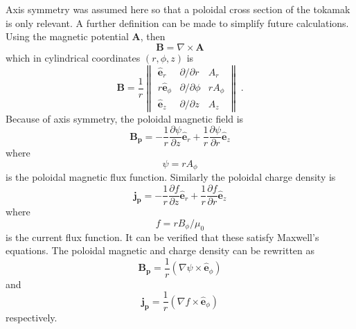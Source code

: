 \documentclass[10pt]{proc}
\begin{document}
Axis symmetry was assumed here so that a poloidal cross section of the tokamak is only relevant. A further definition can be made to simplify future calculations. Using the magnetic potential $\mathbf{A}$, then
\begin{equation}
  \mathbf{B} = \nabla \times \mathbf{A}
\end{equation}
which in cylindrical coordinates $(r,\phi,z)$ is
\begin{equation}
  \mathbf{B} = 
  \dfrac{1}{r}
  \left \|\begin{matrix}
  \widehat{\mathbf{e}}_r & \partial/\partial r & A_r \\
  r \widehat{\mathbf{e}}_\phi & \partial/\partial\phi & rA_\phi \\
  \widehat{\mathbf{e}}_z & \partial/\partial z & A_z
  \end{matrix}\right \| \ .
\end{equation}
Because of axis symmetry, the poloidal magnetic field is
\begin{equation}
  \mathbf{B_p} = -\dfrac{1}{r}\dfrac{\partial \psi}{\partial z}\widehat{\mathbf{e}}_r + \frac{1}{r}\dfrac{\partial\psi}{\partial r}\widehat{\mathbf{e}}_z
\end{equation}
where
\begin{equation}
\psi = rA_\phi
\end{equation}
is the poloidal magnetic flux function. Similarly the poloidal charge density is
\begin{equation}
  \mathbf{j_p} = -\dfrac{1}{r}\dfrac{\partial f}{\partial z}\widehat{\mathbf{e}}_r + \frac{1}{r}\dfrac{\partial f}{\partial r}\widehat{\mathbf{e}}_z
\end{equation}
where
\begin{equation}
  f = r B_\phi /\mu_0
\end{equation}
is the current flux function. It can be verified that these satisfy Maxwell's equations. The poloidal magnetic and charge density can be rewritten as
\begin{equation}
  \mathbf{B_p} = \dfrac{1}{r}\left(\nabla\psi\times\widehat{\mathbf{e}}_\phi\right)
  \label{eq:poloidal_magnetic}
\end{equation}
and
\begin{equation}
  \mathbf{j_p} = \dfrac{1}{r}\left(\nabla f\times\widehat{\mathbf{e}}_\phi\right)
  \label{eq:poloidal_current}
\end{equation}
respectively.
\end{document}
